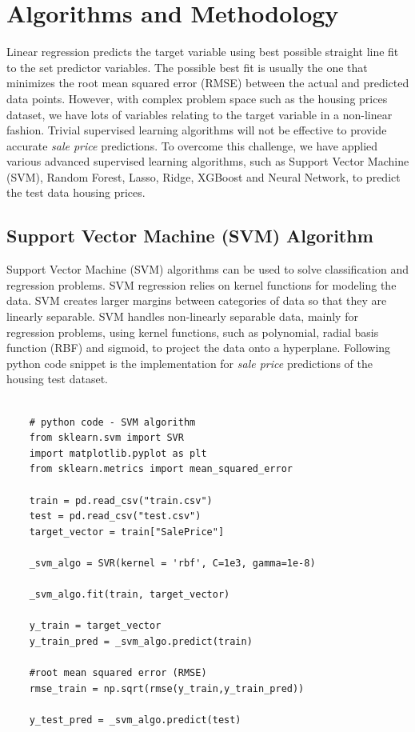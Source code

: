 \documentclass[sigconf]{acmart}
\begin{document}
	\section{Algorithms and Methodology}
	
	Linear regression predicts the target variable using best possible straight line fit to the set predictor variables. The possible best fit is usually the one that minimizes the root mean squared error (RMSE) between the actual and predicted data points. However, with complex problem space such as the housing prices dataset, we have lots of variables relating to the target variable in a non-linear fashion. Trivial supervised learning algorithms will not be effective to provide accurate {\em sale price} predictions. To overcome this challenge, we have applied various advanced supervised learning algorithms, such as Support Vector Machine (SVM), Random Forest, Lasso, Ridge, XGBoost and Neural Network, to predict the test data housing prices.
	
	
	\subsection{Support Vector Machine (SVM) Algorithm}
	
	Support Vector Machine (SVM) algorithms can be used to solve classification and regression problems. SVM regression relies on kernel functions for modeling the data. SVM creates larger margins between categories of data so that they are linearly separable. SVM handles non-linearly separable data, mainly for regression problems, using kernel functions, such as polynomial, radial basis function (RBF) and sigmoid, to project the data onto a hyperplane. Following python code snippet is the implementation for {\em sale price} predictions of the housing test dataset.
	
	\begin{verbatim}
	
	# python code - SVM algorithm
	from sklearn.svm import SVR
	import matplotlib.pyplot as plt
	from sklearn.metrics import mean_squared_error
	
	train = pd.read_csv("train.csv")
	test = pd.read_csv("test.csv")
	target_vector = train["SalePrice"]
	
	_svm_algo = SVR(kernel = 'rbf', C=1e3, gamma=1e-8)	
	
	_svm_algo.fit(train, target_vector)    
	
	y_train = target_vector
	y_train_pred = _svm_algo.predict(train)
	
	#root mean squared error (RMSE)
	rmse_train = np.sqrt(rmse(y_train,y_train_pred))
	
	y_test_pred = _svm_algo.predict(test)
	
	\end{verbatim}
	
\end{document}
